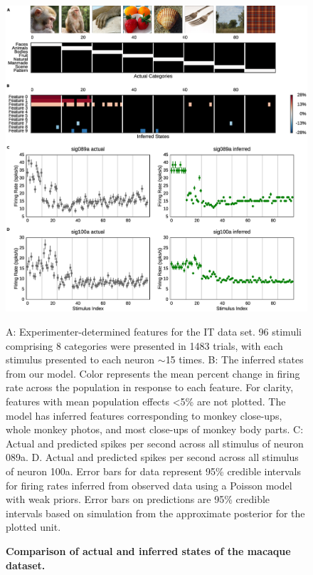\documentclass[10pt,letterpaper]{article}
\newcommand{\added}[1]{\textcolor{added}{#1}}
\begin{document}
\begin{figure}[!h]
    \includegraphics[width=\linewidth]{imgclust}
	\caption{\bf Comparison of actual and inferred states of the macaque dataset.}
    A: \added{Experimenter-determined features for the IT data set.} 96 stimuli comprising 8 categories were presented in 1483 trials, with each stimulus presented to each neuron $\sim$15 times. B: The inferred states from our model. \added{Color represents the mean percent change in firing rate across the population in response to each feature. For clarity, features with mean population effects <5\% are not plotted. The model has inferred features corresponding to monkey close-ups, whole monkey photos, and most close-ups of monkey body parts.} C: Actual and predicted spikes per second across all stimulus of neuron 089a. D. Actual and predicted spikes per second across all stimulus of neuron 100a. Error bars for data represent 95\% credible intervals for \added{firing rates inferred from observed data using a Poisson model with weak priors.} Error bars on predictions are 95\% credible intervals based on simulation from the approximate posterior for the \added{plotted} unit.
	\label{fig:imgclust}
\end{figure}
\end{document}
